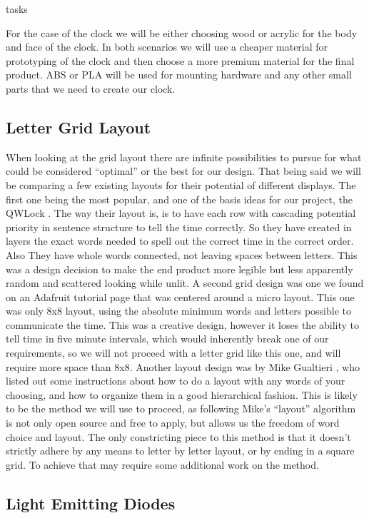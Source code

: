 tasks\documentclass[onecolumn, draftclsnofoot,10pt, compsoc]{IEEEtran}
\begin{document}
For the case of the clock we will be either choosing wood or acrylic for the body and face of the clock.
In both scenarios we will use a cheaper material for prototyping of the clock and then choose a more premium material for the final product.
ABS or PLA will be used for mounting hardware and any other small parts that we need to create our clock.

\subsection{Letter Grid Layout}
When looking at the grid layout there are infinite possibilities to pursue for what could be considered “optimal” or the best for our design.
That being said we will be comparing a few existing layouts for their potential of different displays.
The first one being the most popular, and one of the basis ideas for our project, the QWLock \cite{QWLock}.
The way their layout is, is to have each row with cascading potential priority in sentence structure to tell the time correctly.
So they have created in layers the exact words needed to spell out the correct time in the correct order.
Also They have whole words connected, not leaving spaces between letters.
This was a design decision to make the end product more legible but less apparently random and scattered looking while unlit.
A second grid design was one we found on an Adafruit tutorial page \cite{smallgrid} that was centered around a micro layout.
This one was only 8x8 layout, using the absolute minimum words and letters possible to communicate the time.
This was a creative design, however it loses the ability to tell time in five minute intervals, which would inherently break one of our requirements, so we will not proceed with a letter grid like this one, and will require more space than 8x8.
Another layout design was by Mike Gualtieri \cite{mikegrid}, who listed out some instructions about how to do a layout with any words of your choosing, and how to organize them in a good hierarchical fashion.
This is likely to be the method we will use to proceed, as following Mike’s “layout” algorithm is not only open source and free to apply, but allows us the freedom of word choice and layout.
The only constricting piece to this method is that it doesn’t strictly adhere by any means to letter by letter layout, or by ending in a square grid.
To achieve that may require some additional work on the method.

\subsection{Light Emitting Diodes}
\end{document}
